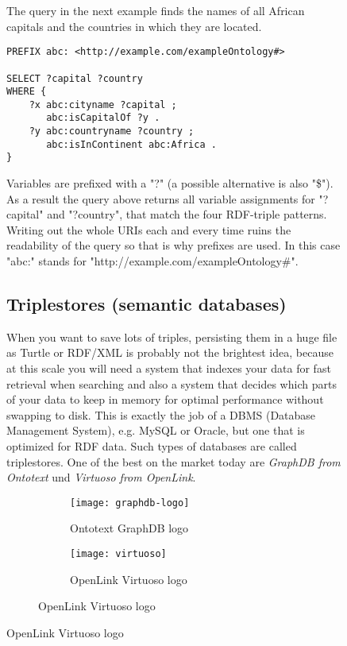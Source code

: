 \begin{figure}[h!]
The query in the next example finds the names of all African capitals and the countries in which they are located.

\begin{verbatim}
PREFIX abc: <http://example.com/exampleOntology#>

SELECT ?capital ?country
WHERE {
    ?x abc:cityname ?capital ;
       abc:isCapitalOf ?y .
    ?y abc:countryname ?country ;
       abc:isInContinent abc:Africa .
}
\end{verbatim}

Variables are prefixed with a "?" (a possible alternative is also "\$"). As a result the query above returns all variable assignments for "?capital" and "?country", that match the four RDF-triple patterns. Writing out the whole URIs each and every time ruins the readability of the query so that is why prefixes are used. In this case "abc:" stands for "http://example.com/exampleOntology\#".

\subsection{Triplestores (semantic databases)}
When you want to save lots of triples, persisting them in a huge file as Turtle or RDF/XML is probably not the brightest idea, because at this scale you will need a system that indexes your data for fast retrieval when searching and also a system that decides which parts of your data to keep in memory for optimal performance without swapping to disk.
This is exactly the job of a DBMS (Database Management System), e.g. MySQL or Oracle, but one that is optimized for RDF data. Such types of databases are called triplestores. One of the best on the market today are \textit{GraphDB from Ontotext} und \textit{Virtuoso from OpenLink}.

\begin{figure}[h!]
    \caption{Famous triplestore logos}
    \begin{subfigure}[b]{0.5\textwidth}
        \centering
        \texttt{[image: graphdb-logo]}
        \caption{Ontotext GraphDB logo}
        \label{fig:view}
    \end{subfigure}
    \begin{subfigure}[b]{0.5\textwidth}
        \centering
        \texttt{[image: virtuoso]}
        \caption{OpenLink Virtuoso logo}
    \label{fig:view}
    \end{subfigure}
\end{figure}


\end{figure}

